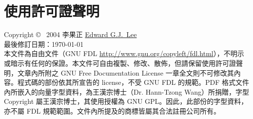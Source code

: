 
\chapter*{使用許可證聲明}

\linespread{1.2}\selectfont

\colorbox{mygray}{
\begin{minipage}{1.0\textwidth}

Copyright \copyright~ 2004 李果正 \href{mailto:edt1023@info.sayya.org}{Edward G.J.\ Lee} \\
最後修訂日期：\today \\
本文件為自由文件（GNU FDL \url{http://www.gnu.org/copyleft/fdl.html}），不明示或暗示有任何的保證。本文件可自由複製、修改、散佈，但請保留使用許可證聲明，文章內所附之 GNU Free Documentation License 一章全文則不可修改其內容。程式碼的部份依其所宣告的 license，不受 GNU FDL 的規範。PDF 格式文件內所嵌入的向量字型資料，為王漢宗博士（Dr. Hann-Tzong Wang）所捐贈，字型 Copyright 屬王漢宗博士，其使用授權為 GNU GPL。因此，此部份的字型資料，亦不屬 FDL 規範範圍。文件內所提及的商標皆屬其合法註冊公司所有。 

\end{minipage}
}
